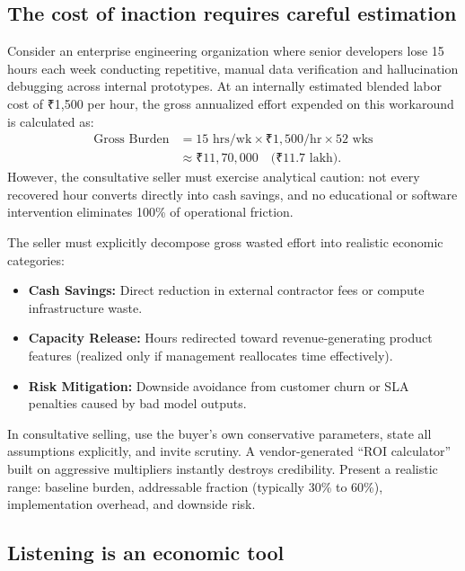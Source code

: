 \subsection{The cost of inaction requires careful estimation}

Consider an enterprise engineering organization where senior developers lose 15 hours each week conducting repetitive, manual data verification and hallucination debugging across internal prototypes. At an internally estimated blended labor cost of ₹1,500 per hour, the gross annualized effort expended on this workaround is calculated as:
\begin{equation}
\begin{aligned}
\text{Gross Burden} &= 15 \text{ hrs/wk} \times ₹1,500/\text{hr} \times 52 \text{ wks} \\
&\approx ₹11,70,000 \quad \text{(₹11.7 lakh)}.
\end{aligned}
\end{equation}
However, the consultative seller must exercise analytical caution: not every recovered hour converts directly into cash savings, and no educational or software intervention eliminates 100\% of operational friction.

The seller must explicitly decompose gross wasted effort into realistic economic categories:
\begin{itemize}
\item \textbf{Cash Savings:} Direct reduction in external contractor fees or compute infrastructure waste.
\item \textbf{Capacity Release:} Hours redirected toward revenue-generating product features (realized only if management reallocates time effectively).
\item \textbf{Risk Mitigation:} Downside avoidance from customer churn or SLA penalties caused by bad model outputs.
\end{itemize}
In consultative selling, use the buyer's own conservative parameters, state all assumptions explicitly, and invite scrutiny. A vendor-generated ``ROI calculator'' built on aggressive multipliers instantly destroys credibility. Present a realistic range: baseline burden, addressable fraction (typically 30\% to 60\%), implementation overhead, and downside risk.

\subsection{Listening is an economic tool}

